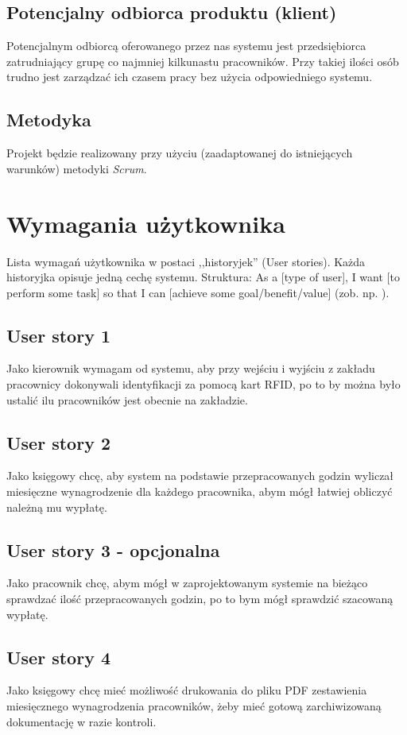 \documentclass[a4paper]{article}
\begin{document}
\subsection{Potencjalny odbiorca produktu (klient)}

Potencjalnym odbiorcą oferowanego przez nas systemu jest przedsiębiorca zatrudniający grupę co najmniej kilkunastu pracowników. Przy takiej ilości osób trudno jest zarządzać ich czasem pracy bez użycia odpowiedniego systemu.  

\subsection{Metodyka}

Projekt będzie realizowany przy użyciu (zaadaptowanej do istniejących warunków) metodyki {\em Scrum}. 

\section{Wymagania użytkownika}
Lista wymagań użytkownika w postaci ,,historyjek'' (User stories). Każda historyjka opisuje jedną cechę systemu. Struktura: As a [type of user], I want [to perform some task] so that I can [achieve some goal/benefit/value] (zob. np. \cite{us}).

\subsection{User story 1}
Jako kierownik wymagam od systemu, aby przy wejściu i wyjściu z zakładu pracownicy dokonywali identyfikacji za pomocą kart RFID, po to by można było ustalić ilu pracowników jest obecnie na zakładzie.

\subsection{User story 2}
Jako księgowy chcę, aby system na podstawie przepracowanych godzin wyliczał miesięczne wynagrodzenie dla każdego pracownika, abym mógł łatwiej obliczyć należną mu wypłatę.

\subsection{User story 3 - opcjonalna}
Jako pracownik chcę, abym mógł w zaprojektowanym systemie na bieżąco sprawdzać ilość przepracowanych godzin, po to bym mógł sprawdzić szacowaną wypłatę.

\subsection{User story 4}
Jako księgowy chcę mieć możliwość drukowania do pliku PDF zestawienia miesięcznego wynagrodzenia pracowników, żeby mieć gotową zarchiwizowaną dokumentację w razie kontroli.
\end{document}
